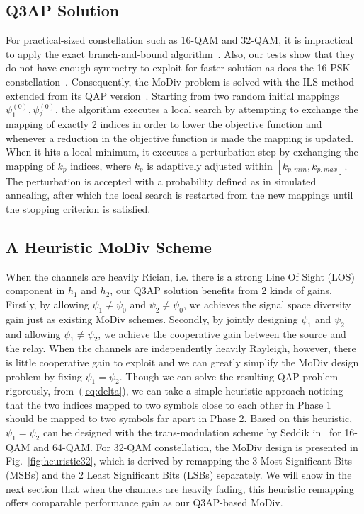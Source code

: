 \documentclass[journal]{IEEEtran}
\begin{document}
\subsection{Q3AP Solution}
For practical-sized constellation such as 16-QAM and 32-QAM, it is impractical
to apply the exact branch-and-bound algorithm~\cite{hahn2008quadratic}. Also,
our tests show that they do not have enough symmetry to exploit for faster
solution as does the 16-PSK constellation~\cite{mittelmann2015solving}.
Consequently, the MoDiv problem is solved with the ILS
method~\cite{hahn2008quadratic} extended from its QAP
version~\cite{stutzle2006iterated}. Starting from two random initial mappings
$\psi_1^{(0)}, \psi_2^{(0)}$, the algorithm executes a local search by
attempting to exchange the mapping of exactly 2 indices in order to lower the
objective function and whenever a reduction in the objective function is made
the mapping is updated. When it hits a local minimum, it executes a perturbation
step by exchanging the mapping of $k_p$ indices, where $k_p$ is adaptively
adjusted within $[k_{p,min}, k_{p,max}]$. The perturbation is accepted with a
probability defined as in simulated annealing, after which the local search is
restarted from the new mappings until the stopping criterion is satisfied.

\subsection{A Heuristic MoDiv Scheme}
\label{sec:heuristic}
When the channels are heavily Rician, i.e. there is a strong Line Of Sight (LOS)
component in $h_1$ and $h_2$,  our Q3AP solution benefits from 2 kinds of gains.
Firstly, by allowing $\psi_1\not=\psi_0$ and $\psi_2\not=\psi_0$, we achieves
the signal space diversity gain just as existing MoDiv schemes. Secondly, by
jointly designing $\psi_1$ and $\psi_2$ and allowing $\psi_1\not=\psi_2$, we
achieve the cooperative gain between the source and the relay. When the channels
are independently heavily Rayleigh, however, there is little cooperative gain to
exploit and we can greatly simplify the MoDiv design problem by fixing
$\psi_1=\psi_2$. Though we can solve the resulting QAP problem rigorously, 
from~(\ref{eq:delta}), we can take a simple heuristic approach noticing that the
two indices mapped to two symbols close to each other in Phase 1 should be
mapped to two symbols far apart in Phase 2. Based on this
heuristic, $\psi_1=\psi_2$ can be designed with the trans-modulation scheme by
Seddik in~\cite{seddik2008trans} for 16-QAM and 64-QAM. For 32-QAM
constellation, the MoDiv design is presented in Fig.~\ref{fig:heuristic32}, which is
derived by remapping the 3 Most Significant Bits (MSBs) and the 2 Least
Significant Bits (LSBs) separately. We will show in the next section that when
the channels are heavily fading, this heuristic remapping offers comparable
performance gain as our Q3AP-based MoDiv.
\end{document}
